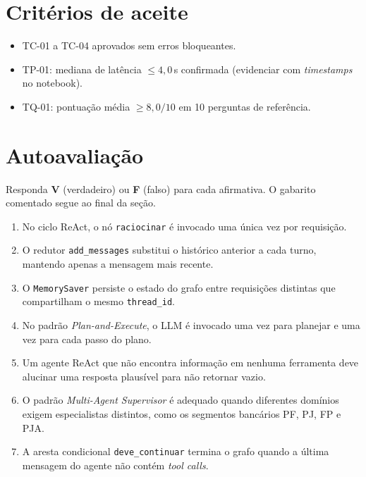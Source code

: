 \section{Crit\'erios de aceite}

\begin{itemize}[leftmargin=*]
  \item TC-01 a TC-04 aprovados sem erros bloqueantes.
  \item TP-01: mediana de lat\^encia $\leq 4{,}0$\,s confirmada
        (evidenciar com \textit{timestamps} no notebook).
  \item TQ-01: pontua\c{c}\~ao m\'edia $\geq 8{,}0/10$ em 10
        perguntas de refer\^encia.
\end{itemize}

\section{Autoavalia\c{c}\~ao}
\label{sec:autoavaliacao_cap03}

Responda \textbf{V} (verdadeiro) ou \textbf{F} (falso) para cada
afirmativa. O gabarito comentado segue ao final da se\c{c}\~ao.

\begin{enumerate}[leftmargin=*]

  \item No ciclo ReAct, o n\'o \texttt{raciocinar} \'e invocado uma
        \'unica vez por requisi\c{c}\~ao.

  \item O redutor \texttt{add\_messages} substitui o hist\'orico
        anterior a cada turno, mantendo apenas a mensagem mais recente.

  \item O \texttt{MemorySaver} persiste o estado do grafo entre
        requisi\c{c}\~oes distintas que compartilham o mesmo
        \texttt{thread\_id}.

  \item No padr\~ao \textit{Plan-and-Execute}, o LLM \'e invocado
        uma vez para planejar e uma vez para cada passo do plano.

  \item Um agente ReAct que n\~ao encontra informa\c{c}\~ao em
        nenhuma ferramenta deve alucinar uma resposta plaus\'ivel
        para n\~ao retornar vazio.

  \item O padr\~ao \textit{Multi-Agent Supervisor} \'e adequado
        quando diferentes dom\'inios exigem especialistas distintos,
        como os segmentos banc\'arios PF, PJ, FP e PJA.

  \item A aresta condicional \texttt{deve\_continuar} termina o grafo
        quando a \'ultima mensagem do agente n\~ao cont\'em
        \textit{tool calls}.

\end{enumerate}

